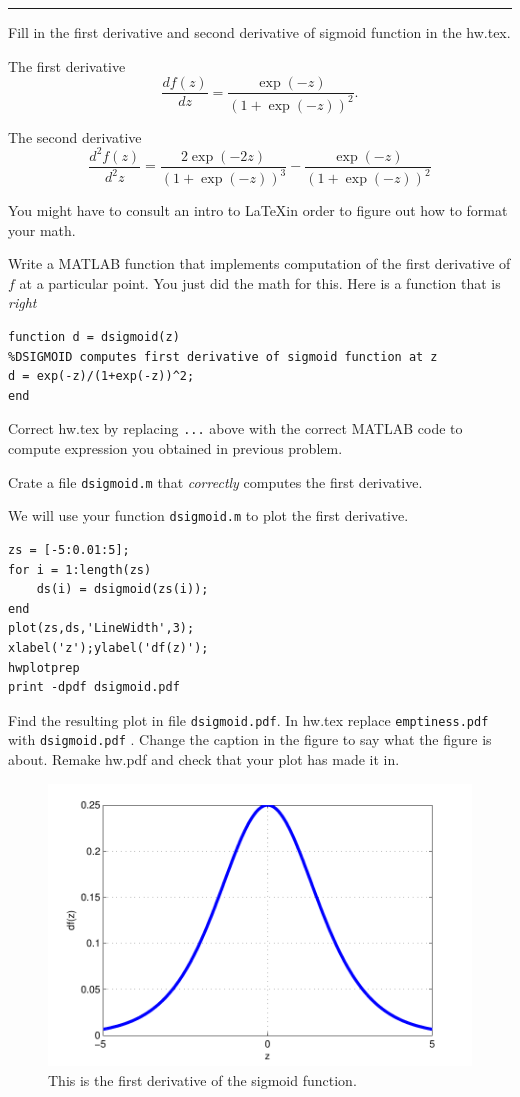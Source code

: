 \documentclass{article}
\begin{document}
\hrule

\newproblem{1pt}
Fill in the first derivative and second derivative of sigmoid function in the hw\theHW.tex.

The first derivative
\[
\frac{d f(z)}{dz} =  \frac{\exp(-z)}{(1+\exp(-z))^2}.%
\]

The second derivative
\[
\frac{d^2 f(z)}{d^2z} = \frac{2\exp(-2z)}{(1+\exp(-z))^3} 
- \frac{\exp(-z)}{(1+\exp(-z))^2}
\]

You might have to consult an intro to \LaTeX in order to figure out how to format your math.

\newproblem{1pt}
Write a MATLAB function that implements computation  of the first derivative of $f$ at a particular point. You just did the math for this.
Here is a function that is {\em right}
\begin{verbatim}
function d = dsigmoid(z)
%DSIGMOID computes first derivative of sigmoid function at z
d = exp(-z)/(1+exp(-z))^2;
end
\end{verbatim}
Correct hw\theHW.tex by replacing {\tt ...} above with the correct MATLAB code to compute expression you obtained in previous problem.

Crate a file {\tt dsigmoid.m} that {\em correctly} computes the first derivative.

\newproblem{1pt}

We will use your function {\tt dsigmoid.m} to plot the first derivative.
\begin{verbatim}
zs = [-5:0.01:5];
for i = 1:length(zs)
    ds(i) = dsigmoid(zs(i));
end
plot(zs,ds,'LineWidth',3);
xlabel('z');ylabel('df(z)');
hwplotprep
print -dpdf dsigmoid.pdf
\end{verbatim}

Find the resulting plot in file {\tt dsigmoid.pdf}. In hw\theHW.tex replace {\tt emptiness.pdf} with {\tt dsigmoid.pdf} . Change the
caption in the figure to say what the figure is about. Remake hw\theHW.pdf and check that your plot has made it in.
\begin{figure}[H]
\begin{center}
\includegraphics[scale=0.5]{dsigmoid.pdf}
\caption{This is the first derivative of the sigmoid function.}
\end{center}
\end{figure}
\end{document}

